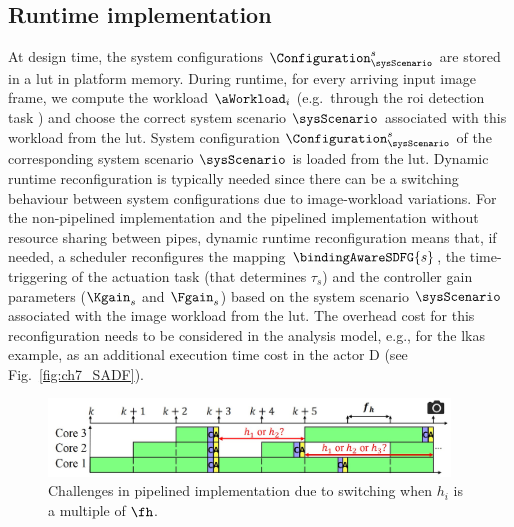 \subsection{Runtime implementation}
\label{sec:ch7_runtimeImplementation}
At design time, the system configurations $\Configuration_{\sysScenario}^s$ are stored in a \gls{lut} in platform memory.
During runtime, for every arriving input image frame, we compute the workload $\aWorkload_i$ (e.g.\ through the \gls{roi} detection task \taskRoID) and choose the correct system scenario $\sysScenario$ associated with this workload from the \gls{lut}.
System configuration $\Configuration_{\sysScenario}^s$ of the corresponding system scenario $\sysScenario$ is loaded from the \gls{lut}.  Dynamic runtime reconfiguration is typically needed since there can be a  switching behaviour between system configurations due to image-workload variations.
For the non-pipelined implementation and the pipelined implementation without resource sharing between pipes, dynamic runtime reconfiguration means that, if needed, a scheduler reconfigures the mapping $\bindingAwareSDFG{s}$, the time-triggering of the actuation task (that determines $\tau_s$) and the controller gain parameters ($\Kgain_s$ and $\Fgain_s$) based on the system scenario $\sysScenario$ associated with the image workload from the \gls{lut}. 
The overhead cost for this reconfiguration needs to be considered in the analysis model, e.g., for the \gls{lkas} example, as an additional execution time cost in the actor D (see Fig.~\ref{fig:ch7_SADF}). 

\begin{figure}[t]
    \centering
    \includegraphics[width=0.95\textwidth]{images/pipeChallenge.jpg}
    \caption{Challenges in pipelined implementation due to switching when $h_i$ is a multiple of $\fh$. 
            }
    \label{fig:ch7_pipeChallenge}
   \vspace{-1em}
\end{figure}

